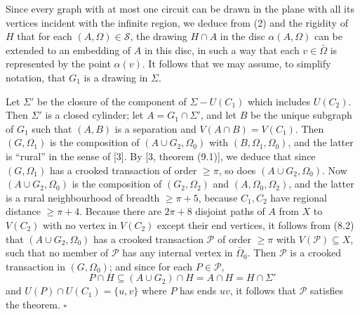Since every graph with at most one circuit can be drawn in the plane with all its vertices incident with the infinite region, we deduce from (2) and the rigidity of $H$ that for each $(A, \Omega) \in \mathscr{S}$, the drawing $H \cap A$ in the disc $\alpha(A, \Omega)$ can be extended to an embedding of $A$ in this disc, in such a way that each $v \in \bar{\Omega}$ is represented by the point $\alpha(v)$. It follows that we may assume, to simplify notation, that $G_1$ is a drawing in $\Sigma$.

Let $\Sigma'$ be the closure of the component of $\Sigma - U(C_1)$ which includes $U(C_2)$. Then $\Sigma'$ is a closed cylinder; let $A = G_1 \cap \Sigma'$, and let $B$ be the unique subgraph of $G_1$ such that $(A, B)$ is a separation and $V(A \cap B) = V(C_1)$. Then $(G, \Omega_1)$ is the composition of $(A \cup G_2, \Omega_0)$ with $(B, \Omega_1, \Omega_0)$, and the latter is ``rural'' in the sense of [3]. By [3, theorem (9.1)], we deduce that since $(G, \Omega_1)$ has a crooked transaction of order $\ge \pi$, so does $(A \cup G_2, \Omega_0)$. Now $(A \cup G_2, \Omega_0)$ is the composition of $(G_2, \Omega_2)$ and $(A, \Omega_0, \Omega_2)$, and the latter is a rural neighbourhood of breadth $\ge \pi + 5$, because $C_1, C_2$ have regional distance $\ge \pi + 4$. Because there are $2\pi + 8$ disjoint paths of $A$ from $X$ to $V(C_2)$ with no vertex in $V(C_2)$ except their end vertices, it follows from (8.2) that $(A \cup G_2, \Omega_0)$ has a crooked transaction $\mathscr{P}$ of order $\ge \pi$ with $V(\mathscr{P}) \subseteq X$, such that no member of $\mathscr{P}$ has any internal vertex in $\bar{\Omega}_0$. Then $\mathscr{P}$ is a crooked transaction in $(G, \Omega_0)$; and since for each $P \in \mathscr{P}$,
\begin{equation*}
P \cap H \subseteq (A \cup G_2) \cap H = A \cap H = H \cap \Sigma'
\end{equation*}
and $U(P) \cap U(C_1) = \{u, v\}$ where $P$ has ends $uv$, it follows that $\mathscr{P}$ satisfies the theorem. $\square$
